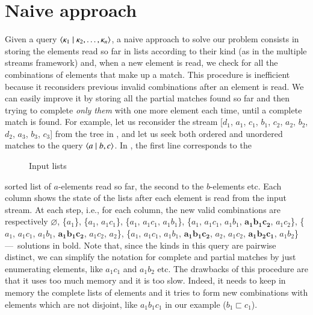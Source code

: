 
\section{Naive approach}
\label{naive}
 
\noindent Given a query \(\langle \kappa_1 \mid \kappa_2, \dots,
  \kappa_n\rangle\), a naive approach to solve our problem consists in
storing the elements read so far in lists according to their kind (as
in the multiple streams framework) and, when a new element is read, we
check for all the combinations of elements that make up a match. This
procedure is inefficient because it reconsiders previous invalid
combinations after an element is read. We can easily improve it by
storing all the partial matches found so far and then trying to
complete \emph{only them} with one more element each time, until a
complete match is found. For example, let us reconsider the stream
[\(d_1\), \(a_1\), \(c_1\), \(b_1\), \(c_2\), \(a_2\), \(b_2\),
  \(d_2\), \(a_3\), \(b_3\), \(c_3\)] from the \XML tree in
, and let us seek both ordered and unordered matches
to the query \(\langle a \mid b,c\rangle\). In , the first
line corresponds to the
\begin{wrapfigure}[8]{r}{0pt}
\centering
{}
\caption{Input lists\label{fig:input_lists}}
\end{wrapfigure}
sorted list of \(a\)-elements read so far, the second to the
\(b\)-elements etc. Each column shows the state of the lists after
each element is read from the input stream.  At each step, i.e., for
each column, the new valid combinations are respectively
\(\varnothing\), \{\(a_1\)\}, \{\(a_1\), \(a_1c_1\)\}, \{\(a_1\),
\(a_1c_1\), \(a_1b_1\)\}, \{\(a_1\), \(a_1c_1\), \(a_1b_1\),
\(\mathbf{a_1b_1c_2}\), \(a_1c_2\)\}, \{\(a_1\), \(a_1c_1\),
\(a_1b_1\), \(\mathbf{a_1b_1c_2}\), \(a_1c_2\), \(a_2\)\}, \{\(a_1\),
\(a_1c_1\), \(a_1b_1\), \(\mathbf{a_1b_1c_2}\), \(a_2\), \(a_1c_2\),
\(\mathbf{a_1b_2c_1}\), \(a_1b_2\)\} ---~solutions in bold. Note that,
since the kinds in this query are pairwise distinct, we can simplify
the notation for complete and partial matches by just enumerating
elements, like \(a_1c_1\) and \(a_1b_2\) etc. The drawbacks of this
procedure are that it uses too much memory and it is too slow. Indeed,
it needs to keep in memory the complete lists of elements and it tries
to form new combinations with elements which are not disjoint, like
\(a_1b_1c_1\) in our example (\(b_1 \sqsubset c_1\)).
